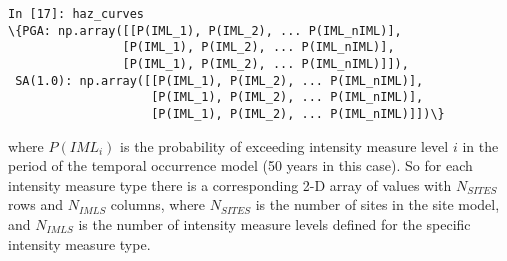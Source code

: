 \begin{enumerate}
\begin{Verbatim}[frame=single, commandchars=\\\{\}, fontsize=\scriptsize, samepage=true]
In [17]: haz_curves
\{PGA: np.array([[P(IML_1), P(IML_2), ... P(IML_nIML)],
                [P(IML_1), P(IML_2), ... P(IML_nIML)],
                [P(IML_1), P(IML_2), ... P(IML_nIML)]]),
 SA(1.0): np.array([[P(IML_1), P(IML_2), ... P(IML_nIML)],
                    [P(IML_1), P(IML_2), ... P(IML_nIML)],
                    [P(IML_1), P(IML_2), ... P(IML_nIML)]])\}
\end{Verbatim}

where $P(IML_i)$ is the probability of exceeding intensity measure level $i$ in the period of the temporal occurrence model (50 years in this case). So for each intensity measure type there is a corresponding 2-D array of values with $N_{SITES}$ rows and $N_{IMLS}$ columns, where $N_{SITES}$ is the number of sites in the site model, and $N_{IMLS}$ is the number of intensity measure levels defined for the specific intensity measure type.

\end{enumerate}

